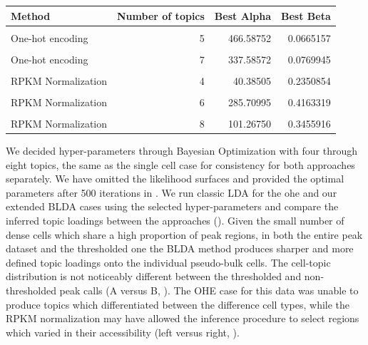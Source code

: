 \begin{table}
  \centering
  \begin{tabular}[t]{lrrr}
  \toprule
  Method & Number of topics & Best Alpha & Best Beta\\
  \midrule
  \cellcolor{gray!6}{One-hot encoding} & \cellcolor{gray!6}{4} & \cellcolor{gray!6}{123.68822} & \cellcolor{gray!6}{0.0382351}\\
  One-hot encoding & 5 & 466.58752 & 0.0665157\\
  \cellcolor{gray!6}{One-hot encoding} & \cellcolor{gray!6}{6} & \cellcolor{gray!6}{450.96735} & \cellcolor{gray!6}{0.0756824}\\
  One-hot encoding & 7 & 337.58572 & 0.0769945\\
  \cellcolor{gray!6}{One-hot encoding} & \cellcolor{gray!6}{8} & \cellcolor{gray!6}{100.35205} & \cellcolor{gray!6}{0.0872716}\\
  \addlinespace
  RPKM Normalization & 4 & 40.38505 & 0.2350854\\
  \cellcolor{gray!6}{RPKM Normalization} & \cellcolor{gray!6}{5} & \cellcolor{gray!6}{285.51986} & \cellcolor{gray!6}{0.3011584}\\
  RPKM Normalization & 6 & 285.70995 & 0.4163319\\
  \cellcolor{gray!6}{RPKM Normalization} & \cellcolor{gray!6}{7} & \cellcolor{gray!6}{366.02309} & \cellcolor{gray!6}{0.3825605}\\
  RPKM Normalization & 8 & 101.26750 & 0.3455916\\
  \bottomrule
  \end{tabular}
  \label{table:pb_opt_params}
\end{table}

We decided hyper-parameters through Bayesian Optimization with four through eight topics, the same as the single cell case for consistency for both approaches separately. We have omitted the likelihood surfaces and provided the optimal parameters after 500 iterations in . We run classic LDA for the \gls{ohe} and our extended BLDA cases using the selected hyper-parameters and compare the inferred topic loadings between the approaches (). Given the small number of dense cells which share a high proportion of peak regions, in both the entire peak dataset and the thresholded one the BLDA method produces sharper and more defined topic loadings onto the individual pseudo-bulk cells. The cell-topic distribution is not noticeably different between the thresholded and non-thresholded peak calls (A versus B, ).
The OHE case for this data was unable to produce topics which differentiated between the difference cell types, while the RPKM normalization may have allowed the inference procedure to select regions which varied in their accessibility (left versus right, ). 

